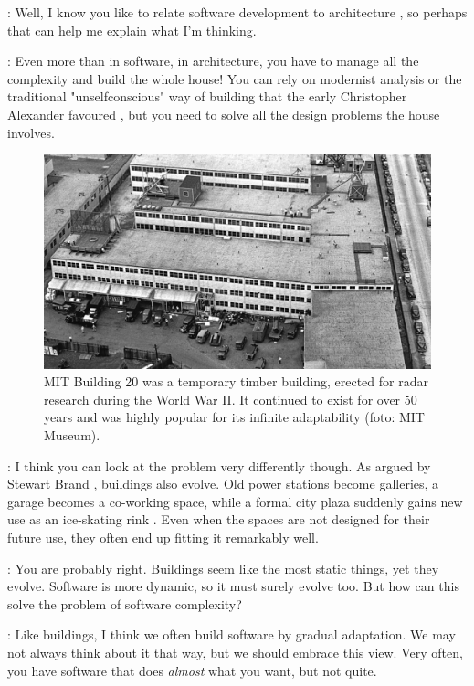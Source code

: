 \documentclass[runningheads]{llncs}
\newcommand{\T}{Tomas}
\newcommand{\J}{Joel}
\newcommand{\says}[2][gg]{\vspace{0.5em}\noindent\hangindent=0.5cm{\textsc{#1}}: #2}
\begin{document}
\says[\J]{Well, I know you like to relate software development to architecture \cite{petricek-2021-architecture}, so perhaps that can help me explain what I'm thinking.}

\says[\T]{Even more than in software, in architecture, you have to manage all the complexity and build the whole house! You can rely on modernist analysis or the traditional "unselfconscious" way of building that the early Christopher Alexander favoured \cite{alexander-1964-notes}, but you need to solve all the design problems the house involves.}

\begin{figure}[t]
\centering
\includegraphics[scale=0.33]{figures/mit20.jpg}
\caption{MIT Building 20 was a temporary timber building, erected for radar research during the World War II. It continued to exist for over 50 years and was highly popular for its infinite
adaptability \cite{brand-1994-buildings} (foto: MIT Museum).}
\label{fig:mit20}
\end{figure}

\says[\J]{I think you can look at the problem very differently though. As argued by Stewart Brand \cite{brand-1994-buildings}, buildings also evolve. Old power stations become galleries, a garage becomes a co-working space, while a formal city plaza suddenly gains new use as an ice-skating rink \cite{cohen-1974-context}. Even when the spaces are not designed for their future use, they often end up fitting it remarkably well.}

\says[\T]{You are probably right. Buildings seem like the most static things, yet they evolve. Software is more dynamic, so it must surely evolve too. But how can this solve the problem of software complexity?}

\says[\J]{Like buildings, I think we often build software by gradual adaptation. We may not always think about it that way, but we should embrace this view. Very often, you have software that does \emph{almost} what you want, but not quite.}
\end{document}
